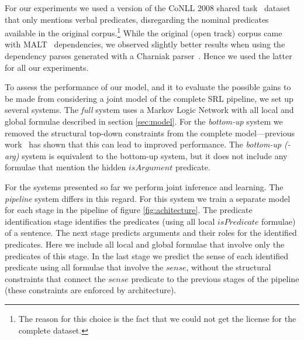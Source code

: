 
For our experiments we used a version of the CoNLL 2008 shared task~\citep{surdeanu08conll} dataset that only mentions verbal predicates, disregarding the nominal predicates available in the original corpus.\footnote{The reason for this choice is the fact that we could not get the license for the complete dataset.} While the original (open track) corpus came with MALT~\citep{nivre2007mli} dependencies, we observed slightly better results when using the dependency parses generated with a Charniak parser~\citep{charniak00amaximum}. Hence we used the latter for all our experiments.


To assess the performance of our model, and it to evaluate the possible gains to be made from considering a joint model of the complete SRL pipeline, we set up several systems. The \emph{full} system uses a Markov Logic Network with all local and global formulae described in section \ref{sec:model}. For the \emph{bottom-up} system we removed the structural top-down constraints from the complete model---previous work~\citet{riedel08collective} has shown that this can lead to improved performance. The \emph{bottom-up (-arg)} system is equivalent to the bottom-up system, but it does not include any formulae that mention the hidden $isArgument$ predicate.

For the systems presented so far we perform joint inference and learning. The \emph{pipeline} system differs in this regard. For this system we train a separate model for each stage in the pipeline of figure \ref{fig:achitecture}. 
The predicate identification stage identifies the predicates (using all local $isPredicate$ formulae) of a sentence. The next stage predicts arguments and their roles for the identified predicates. Here we include all local and global formulae that involve only the predicates of this stage. In the last stage we predict the sense of each identified predicate using all formulae that involve the $sense$, without the structural constraints that connect the $sense$ predicate to the previous stages of the pipeline (these constraints are enforced by architecture).    


